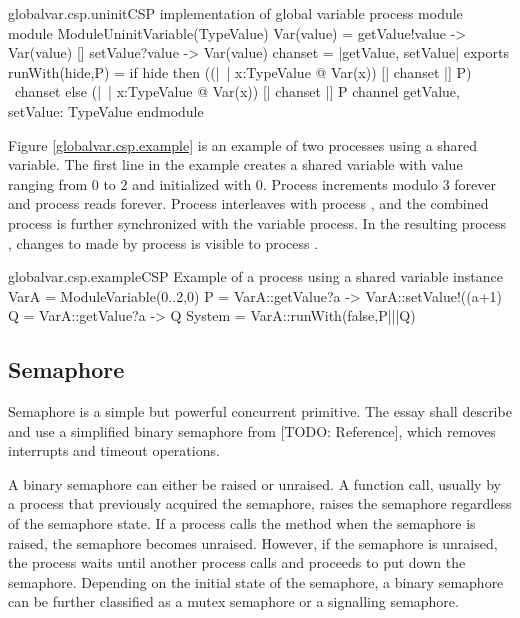 \documentclass{article}
\begin{document}
\begin{cspinline}{globalvar.csp.uninit}{CSP implementation of global variable process module}
module ModuleUninitVariable(TypeValue)
  Var(value) = getValue!value -> Var(value)
            [] setValue?value -> Var(value)
  chanset = {|getValue, setValue|}
exports
  runWith(hide,P) = 
    if hide then ((|~| x:TypeValue @ Var(x)) [| chanset |] P) \ chanset
    else (|~| x:TypeValue @ Var(x)) [| chanset |] P
  channel getValue, setValue: TypeValue
endmodule
\end{cspinline}

Figure \ref{globalvar.csp.example} is an example of two processes using a shared variable. The first line in the example creates a shared variable  with value ranging from $0$ to $2$ and initialized with $0$. Process  increments  modulo $3$ forever and process  reads  forever. Process  interleaves with process , and the combined process is further synchronized with the variable  process. In the resulting process , changes to  made by process  is visible to process .

\begin{cspinline}{globalvar.csp.example}{CSP Example of a process using a shared variable}
instance VarA = ModuleVariable({0..2},0)
P = VarA::getValue?a -> VarA::setValue!((a+1)%
Q = VarA::getValue?a -> Q
System = VarA::runWith(false,P|||Q)
\end{cspinline}


\subsection{Semaphore}
Semaphore is a simple but powerful concurrent primitive. The essay shall describe and use a simplified binary semaphore from [TODO: Reference], which removes interrupts and timeout operations. 

A binary semaphore can either be raised or unraised. A  function call, usually by a process that previously acquired the semaphore, raises the semaphore regardless of the semaphore state. If a process calls the  method when the semaphore is raised, the semaphore becomes unraised. However, if the semaphore is unraised, the process waits until another process calls  and proceeds to put down the semaphore. Depending on the initial state of the semaphore, a binary semaphore can be further classified as a mutex semaphore or a signalling semaphore.
\end{document}
